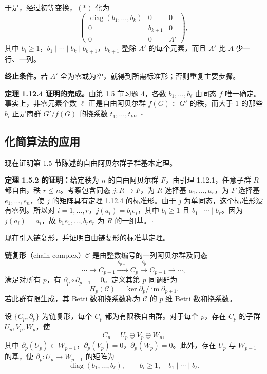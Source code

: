 于是，经过初等变换，$(*)$ 化为
\[
\begin{pmatrix}
\operatorname{diag}(b_1,\ldots,b_k)&0&0\\
0&b_{k+1}&0\\0&0&A'
\end{pmatrix},
\]
其中 $b_i\geq1$，$b_1\mid\cdots\mid b_k\mid b_{k+1}$，$b_{k+1}$ 整除 $A'$ 的每个元素，而且 $A'$ 比 $A$ 少一行、一列。

\noindent\textbf{终止条件。}若 $A'$ 全为零或为空，就得到所需标准形；否则重复主要步骤。

\noindent\textbf{定理 1.12.4 证明的完成。}由第 1.5 节习题 4，各数 $b_1,\ldots,b_\ell$ 由同态 $f$ 唯一确定。事实上，非零元素个数 $\ell$ 正是自由阿贝尔群 $f(G)\subset G'$ 的秩，而大于 $1$ 的那些 $b_i$ 正是商群 $G'/f(G)$ 的挠系数 $t_1,\ldots,t_k$。\hfill$\square$

\subsection*{化简算法的应用}
现在证明第 1.5 节陈述的自由阿贝尔群子群基本定理。

\noindent\textbf{定理 1.5.2 的证明：}给定秩为 $n$ 的自由阿贝尔群 $F$，由引理 1.12.1，任意子群 $R$ 都自由，秩 $r\leq n$。考察包含同态 $j:R\to F$，为 $R$ 选择基 $a_1,\ldots,a_r$，为 $F$ 选择基 $e_1,\ldots,e_n$，使 $j$ 的矩阵具有定理 1.12.4 的标准形。由于 $j$ 为单同态，这个标准形没有零列。所以对 $i=1,\ldots,r$，$j(a_i)=b_i e_i$，其中 $b_i\geq1$ 且 $b_1\mid\cdots\mid b_r$。因为 $j(a_i)=a_i$，故 $b_1e_1,\ldots,b_re_r$ 为 $R$ 的一组基。\hfill$\square$

现在引入链复形，并证明自由链复形的标准基定理。

\textbf{链复形}（chain complex）$\mathcal C$ 是由整数编号的一列阿贝尔群及同态
\[
\cdots\longrightarrow C_{p+1}\xrightarrow{\partial_{p+1}}C_p
\xrightarrow{\partial_p}C_{p-1}\longrightarrow\cdots,
\]
满足对所有 $p$，有 $\partial_p\circ\partial_{p+1}=0$。定义其第 $p$ 同调群为
\[
H_p(\mathcal C)=\ker\partial_p/\operatorname{im}\partial_{p+1}.
\]
若此群有限生成，其 Betti 数和挠系数称为 $\mathcal C$ 的 $p$ 维 Betti 数和挠系数。

设 $\{C_p,\partial_p\}$ 为链复形，每个 $C_p$ 都为有限秩自由群。对于每个 $p$，存在 $C_p$ 的子群 $U_p,V_p,W_p$，使
\[
C_p=U_p\oplus V_p\oplus W_p,
\]
其中 $\partial_p(U_p)\subset W_{p-1}$，$\partial_p(V_p)=0$，$\partial_p(W_p)=0$。此外，存在 $U_p$ 与 $W_{p-1}$ 的基，使 $\partial_p:U_p\to W_{p-1}$ 的矩阵为
\[
\operatorname{diag}(b_1,\ldots,b_\ell),\qquad
b_i\geq1,\quad b_1\mid\cdots\mid b_\ell.
\]

